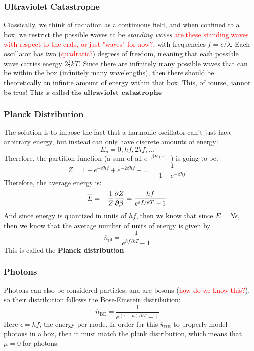 \documentclass[10pt]{article}
\newcommand{\question}[1]{\textcolor{red}{#1}}
\begin{document}
	\subsubsection{Ultraviolet Catastrophe}
	Classically, we think of radiation as a continuous field, and when confined to a box, we restrict the possible waves 
	to be \textit{standing waves} \question{are these standing waves with respect to the ends, or just "waves" for now?}, 
	with frequencies \( f = c / \lambda \). Each oscillator has two (\question{quadratic?}) degrees of freedom, 
	meaning that each possible wave carries energy \( 2 \frac{1}{2}kT \). Since there are infinitely many possible waves 
	that can be within the box (infinitely many wavelengths), then there should be theoretically an infinite amount of energy 
	within that box. This, of course, cannot be true! This is called the \textbf{ultraviolet catastrophe}

	\subsubsection{Planck Distribution}
	The solution is to impose the fact that a harmonic oscillator can't just have arbitrary energy, but instead can only 
	have discrete amounts of energy:
	\[
	E_n = 0, hf, 2hf, \dots 
	\] 
	Therefore, the partition function (a sum of all \( e^{-\beta E(s)} \) ) is going to be:
	\[
	Z = 1 + e^{-\beta hf} + e^{-2\beta hf} + \dots = \frac{1}{1-e^{-\beta hf}}
	\] 
	Therefore, the average energy is:
	\[
		\overline E = -\frac{1}{Z} \pdv{Z}{\beta} = \frac{hf}{e^{hf / kT} - 1}
	\] 
	And since energy is quantized in units of \( hf \), then we know that since  \( \overline E = N\epsilon \), then we know that
	the average number of units of energy is given by
	\[
	\overline n_{\text{pl}} = \frac{1}{e^{hf / kT} -1}
	\] 
	This is called the \textbf{Planck distribution} 

	\subsubsection{Photons}
	Photons can also be considered particles, and are bosons (\question{how do we know this?}), so their distribution follows 
	the Bose-Einstein distribution:
	\[
	\overline n_{\text{BE}} = \frac{1}{e^{(\epsilon - \mu) / kT} - 1}
	\] 
	Here \( \epsilon = hf \), the energy per mode. In order for this \( \overline n_{\text{BE}} \) to properly model
	photons in a box, then it must match the plank distribution, which means that \( \mu = 0 \) for photons. 
	
\end{document}

